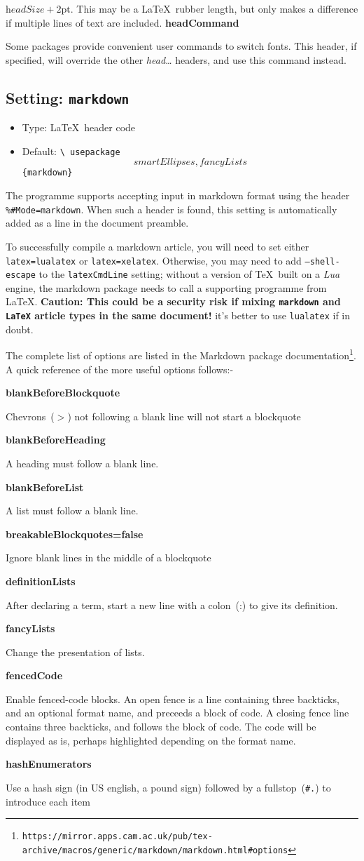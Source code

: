 \documentclass[a4paper,DIV=11]{scrartcl}
\newcommand{\deft}[2]{\nopagebreak\noindent\hspace{0.5in}\textbf{#1}\par\noindent{}#2\pagebreak[1]\par}
\newcommand{\property}[5]{
  \subsection{#1: \texttt{#2}}
  \begin{itemize}
  \item Type: #3
  \item Default: #4
  \end{itemize}
  #5
}
\newcommand{\setting}{\property{Setting}}
\begin{document}
\begin{multicols}{2}
{{    $\textit{headSize} + 2\textrm{pt}$. This may be a \LaTeX\ rubber
    length, but only makes a difference if multiple lines of text are
    included.}
  \deft{headCommand}{Some packages provide convenient user commands to
    switch fonts. This header, if specified, will override the other
    \textit{head\dots} headers, and use this command instead.
  }
}
\setting{markdown}{\LaTeX\ header code}{\texttt{\textbackslash
    usepackage\[smartEllipses,fancyLists\]\{markdown\}}}{
    The programme supports accepting input in markdown format using the
    header \texttt{\%\#Mode=markdown}. When such a header is found,
    this setting is automatically added as a line in the document
    preamble.\par
    To successfully compile a markdown article, you will need to set either
    \texttt{latex=lualatex} or \texttt{latex=xelatex}.
    Otherwise, you may need to add
    \texttt{--shell-escape} to the \texttt{latexCmdLine} setting;
    without a version of \TeX\ built on a \textit{Lua} engine, the
    markdown package needs to call a
    supporting programme from \LaTeX. \textbf{Caution: This could be a
      security risk if mixing \texttt{markdown} and \texttt{LaTeX}
      article types in the same document!} it's better to use
    \texttt{lualatex} if in doubt.\par
    The complete list of options are listed in the Markdown package
    documentation\footnote{\texttt{https://mirror.apps.cam.ac.uk/pub/tex-archive/macros/generic/markdown/markdown.html\#options}}. A
    quick reference of the more useful options follows:-\par
    \deft{blankBeforeBlockquote}{Chevrons~($>$) not following a
      blank line will not start a blockquote}
    \deft{blankBeforeHeading}{A heading must follow a blank line.}
    \deft{blankBeforeList}{A list must follow a blank line.}
    \deft{breakableBlockquotes=false}{Ignore blank lines in the middle
      of a blockquote}
    \deft{definitionLists}{After declaring a term, start a new
      line with a colon~(:) to give its definition.}
    \deft{fancyLists}{Change the presentation of lists.}
    \deft{fencedCode}{Enable fenced-code blocks. An open fence is a line
      containing three backticks, and an optional format name, and
      preceeds a block of code. A closing fence line contains three
      backticks, and follows the block of code. The code will be displayed
      as is, perhaps highlighted depending on the format name.
    }
    \deft{hashEnumerators}{Use a hash sign (in US english, a pound
      sign) followed by a fullstop~(\texttt{\#.}) to introduce each item
}}
\end{multicols}
\end{document}
